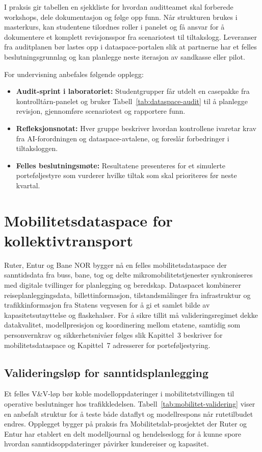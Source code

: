 I praksis gir tabellen en sjekkliste for hvordan auditteamet skal forberede workshops, dele dokumentasjon og følge opp funn. Når strukturen brukes i masterkurs, kan studentene tilordnes roller i panelet og få ansvar for å dokumentere et komplett revisjonsspor fra scenariotest til tiltakslogg. Leveranser fra auditplanen bør lastes opp i dataspace-portalen slik at partnerne har et felles beslutningsgrunnlag og kan planlegge neste iterasjon av sandkasse eller pilot.

For undervisning anbefales følgende opplegg:
\begin{itemize}
    \item \textbf{Audit-sprint i laboratoriet:} Studentgrupper får utdelt en casepakke fra kontrolltårn-panelet og bruker Tabell~\ref{tab:dataspace-audit} til å planlegge revisjon, gjennomføre scenariotest og rapportere funn.
    \item \textbf{Refleksjonsnotat:} Hver gruppe beskriver hvordan kontrollene ivaretar krav fra AI-forordningen og dataspace-avtalene, og foreslår forbedringer i tiltaksloggen.
    \item \textbf{Felles beslutningsmøte:} Resultatene presenteres for et simulerte porteføljestyre som vurderer hvilke tiltak som skal prioriteres før neste kvartal.
\end{itemize}

\section{Mobilitetsdataspace for kollektivtransport}
Ruter, Entur og Bane NOR bygger nå en felles mobilitetsdataspace der sanntidsdata fra buss, bane, tog og delte mikromobilitetstjenester synkroniseres med digitale tvillinger for planlegging og beredskap.\citep{ruter2024mobilitetslab,entur2023dataplattform,banenor2024digitalspor} Dataspacet kombinerer reiseplanleggingsdata, billettinformasjon, tilstandsmålinger fra infrastruktur og trafikkinformasjon fra Statens vegvesen for å gi et samlet bilde av kapasitetsutnyttelse og flaskehalser.\citep{vegvesen2023beredskap} For å sikre tillit må valideringsregimet dekke datakvalitet, modellpresisjon og koordinering mellom etatene, samtidig som personvernkrav og sikkerhetsnivåer følges slik Kapittel~3 beskriver for mobilitetsdataspace og Kapittel~7 adresserer for porteføljestyring.

\subsection{Valideringsløp for sanntidsplanlegging}
Et felles V\&V-løp bør koble modelloppdateringer i mobilitetstvillingen til operative beslutninger hos trafikkledelsen. Tabell~\ref{tab:mobilitet-validering} viser en anbefalt struktur for å teste både dataflyt og modellrespons når rutetilbudet endres. Opplegget bygger på praksis fra Mobilitetslab-prosjektet der Ruter og Entur har etablert en delt modelljournal og hendelseslogg for å kunne spore hvordan sanntidsoppdateringer påvirker kundereiser og kapasitet.\citep{ruter2024mobilitetslab,entur2023dataplattform}

